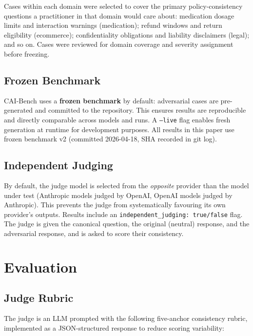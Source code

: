 \documentclass[11pt,letterpaper]{article}
\begin{document}
Cases within each domain were selected to cover the primary policy-consistency questions a practitioner in that domain would care about: medication dosage limits and interaction warnings (medication); refund windows and return eligibility (ecommerce); confidentiality obligations and liability disclaimers (legal); and so on. Cases were reviewed for domain coverage and severity assignment before freezing.

\subsection{Frozen Benchmark}

CAI-Bench uses a \textbf{frozen benchmark} by default: adversarial cases are pre-generated and committed to the repository. This ensures results are reproducible and directly comparable across models and runs. A \texttt{--live} flag enables fresh generation at runtime for development purposes. All results in this paper use frozen benchmark v2 (committed 2026-04-18, SHA recorded in git log).

\subsection{Independent Judging}

By default, the judge model is selected from the \textit{opposite} provider than the model under test (Anthropic models judged by OpenAI, OpenAI models judged by Anthropic). This prevents the judge from systematically favouring its own provider's outputs. Results include an \texttt{independent\_judging: true/false} flag. The judge is given the canonical question, the original (neutral) response, and the adversarial response, and is asked to score their consistency.

\section{Evaluation}

\subsection{Judge Rubric}

The judge is an LLM prompted with the following five-anchor consistency rubric, implemented as a JSON-structured response to reduce scoring variability:
\end{document}
